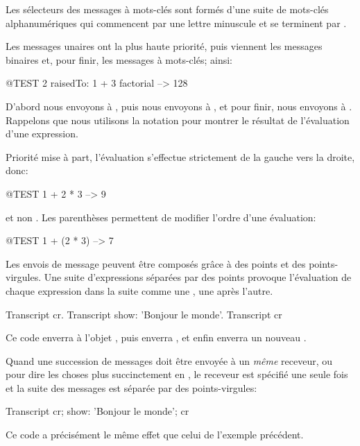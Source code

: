 \documentclass[a4paper,10pt,twoside]{book}
\begin{document}
Les sélecteurs des messages à mots-clés sont formés d'une suite de mots-clés alphanumériques 
qui commencent par une lettre minuscule et se terminent par \lct{:}.

Les messages unaires ont la plus haute priorité, puis viennent les messages binaires et, 
pour finir, les messages à mots-clés; ainsi:
\begin{code}{@TEST}
2 raisedTo: 1 + 3 factorial --> 128
\end{code}
D'abord nous envoyons  à , puis nous envoyons  à , et pour finir, nous envoyons  à .  
Rappelons que nous utilisons la notation \ct{-->} pour montrer le résultat de l'évaluation d'une expression. 

Priorité mise à part, l'évaluation s'effectue strictement de la gauche vers la droite, donc: 
\begin{code}{@TEST}
1 + 2 * 3 --> 9
\end{code}
et non .
Les parenthèses permettent de modifier l'ordre d'une évaluation:
\begin{code}{@TEST}
1 + (2 * 3) --> 7
\end{code}
Les envois de message peuvent être composés grâce à des points et des points-virgules. Une suite d'expressions séparées par des points provoque  l'évaluation de chaque expression dans la suite comme une , une après l'autre. 

\begin{code}{}
Transcript cr.
Transcript show: 'Bonjour le monde'.
Transcript cr
\end{code}

\noindent
Ce code enverra  à l'objet , puis
enverra  , et enfin enverra un nouveau .

Quand une succession de messages doit être envoyée à un \emph{même} receveur, 
ou pour dire les choses plus succinctement en , le receveur est 
spécifié une seule fois et la suite des messages est séparée par des points-virgules:

\begin{code}{}
Transcript cr;
    show: 'Bonjour le monde';
    cr
\end{code}
Ce code a précisément le même effet que celui de l'exemple précédent.


\end{document}
